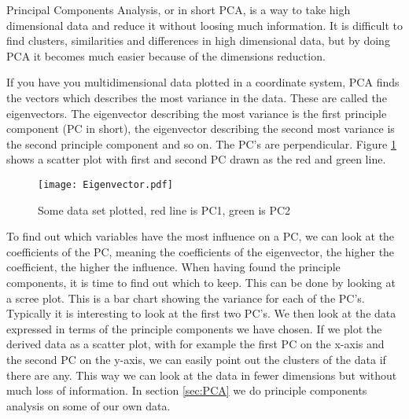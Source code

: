 \documentclass[Report.tex]{subfiles}
\begin{document}
Principal Components Analysis, or in short PCA, is a way to take high dimensional data and reduce it without loosing much information. It is difficult to find clusters, similarities and differences in high dimensional data, but by doing PCA it becomes much easier because of the dimensions reduction. \cite{PCAtheory}

If you have you multidimensional data plotted in a coordinate system, PCA finds the vectors which describes the most variance in the data. These are called the eigenvectors. The eigenvector describing the most variance is the first principle component (PC in short), the eigenvector describing the second most variance is the second principle component and so on. The PC's are perpendicular. Figure \ref{fig:eigen} shows a scatter plot with first and second PC drawn as the red and green line.
\begin{figure}
\center
\texttt{[image: Eigenvector.pdf]}
\caption{Some data set plotted, red line is PC1, green is PC2}
\label{fig:eigen}
\end{figure}

To find out which variables have the most influence on a PC, we can look at the coefficients of the PC, meaning the coefficients of the eigenvector, the higher the coefficient, the higher the influence. 
When having found the principle components, it is time to find out which to keep. This can be done by looking at a scree plot. This is a bar chart showing the variance for each of the PC's. Typically it is interesting to look at the first two PC's. We then look at the data expressed in terms of the principle components we have chosen. If we plot the derived data as a scatter plot, with for example the first PC on the x-axis and the second PC on the y-axis, we can easily point out the clusters of the data if there are any. This way we can look at the data in fewer dimensions but without much loss of information. In section \ref{sec:PCA} we do principle components analysis on some of our own data.
\end{document}
